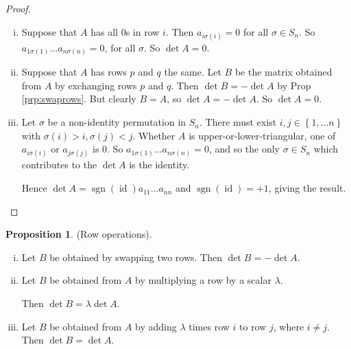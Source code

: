 \documentclass{article}
\theoremstyle{definition} \newtheorem*{definition}{Definition}
\newtheorem{proposition}[theorem]{Proposition}
\DeclareMathOperator{\sgn}{sgn} \DeclareMathOperator{\id}{id}
\begin{document}
  \begin{proof}\hfill 
    \begin{enumerate}[(i)]
      \item 
    Suppose that $A$ has all $0$s in row $i$. Then
    $a_{i\sigma(i)}=0$ for all $\sigma \in S_{n}$. So $a_{1\sigma(1)}\dots
    a_{n\sigma(n)}=0$, for all $\sigma$.
    So $\det A = 0$.
  \item
    Suppose that $A$ has rows $p$ and $q$ the same. Let $B$ be the matrix
    obtained from $A$ by exchanging rows $p$ and $q$. Then $\det B=-\det A$ by
    Prop \ref{prp:swaprows}.  But clearly $B=A$, so $\det A = - \det A$. So
    $\det A=0$.
  \item
    Let $\sigma$ be a non-identity permutation in $S_n$. There must exist $i,j
    \in \left\{ 1,\dots n \right\}$ with $\sigma(i) > i, \sigma(j)<j$. Whether
    $A$ is upper-or-lower-triangular, one of $a_{i\sigma(i)}$ or
    $a_{j\sigma(j)}$ is 0. So $a_{1\sigma(1)}\dots a_{n\sigma(n)}=0$, and so
    the only $\sigma \in S_n$ which contributes to the $\det A$ is the
    identity.

    Hence $\det A = \sgn(\id)a_{11}\dots a_{nn}$ and $\sgn(\id)=+1$, giving the
    result. 

    \end{enumerate}


  \end{proof} \begin{proposition} (Row operations).  \begin{enumerate}[(i)] \item
          Let $B$ be obtained by swapping two rows. Then $\det B=-\det A$.
        \item Let $B$ be obtained from $A$ by multiplying a row by a scalar
          $\lambda$.

          Then $\det B = \lambda \det A$.  \item Let $B$ be obtained from $A$
            by adding $\lambda$ times row $i$ to row $j$, where $i \neq j$.
            Then $\det B = \det A$.  \end{enumerate} \end{proposition}
\end{document}
